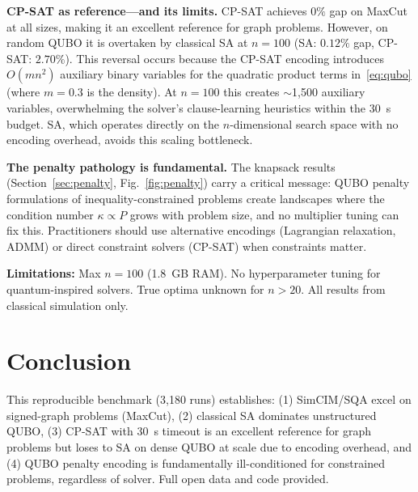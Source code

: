 \documentclass[10pt,twocolumn]{article}
\begin{document}
\textbf{CP-SAT as reference---and its limits.} CP-SAT achieves $0\%$ gap on MaxCut at all sizes, making it an excellent reference for graph problems. However, on random QUBO it is overtaken by classical SA at $n=100$ (SA: $0.12\%$ gap, CP-SAT: $2.70\%$). This reversal occurs because the CP-SAT encoding introduces $O(mn^2)$ auxiliary binary variables for the quadratic product terms in~\eqref{eq:qubo} (where $m=0.3$ is the density). At $n=100$ this creates $\sim$1,500 auxiliary variables, overwhelming the solver's clause-learning heuristics within the 30~s budget. SA, which operates directly on the $n$-dimensional search space with no encoding overhead, avoids this scaling bottleneck.

\textbf{The penalty pathology is fundamental.} The knapsack results (Section~\ref{sec:penalty}, Fig.~\ref{fig:penalty}) carry a critical message: QUBO penalty formulations of inequality-constrained problems create landscapes where the condition number $\kappa \propto P$ grows with problem size, and no multiplier tuning can fix this. Practitioners should use alternative encodings (Lagrangian relaxation, ADMM) or direct constraint solvers (CP-SAT) when constraints matter.

\textbf{Limitations:} Max $n=100$ (1.8~GB RAM). No hyperparameter tuning for quantum-inspired solvers. True optima unknown for $n>20$. All results from classical simulation only.

\section{Conclusion}
\label{sec:conclusion}

This reproducible benchmark (3,180 runs) establishes: (1) SimCIM/SQA excel on signed-graph problems (MaxCut), (2) classical SA dominates unstructured QUBO, (3) CP-SAT with 30~s timeout is an excellent reference for graph problems but loses to SA on dense QUBO at scale due to encoding overhead, and (4) QUBO penalty encoding is fundamentally ill-conditioned for constrained problems, regardless of solver. Full open data and code provided.
\end{document}
